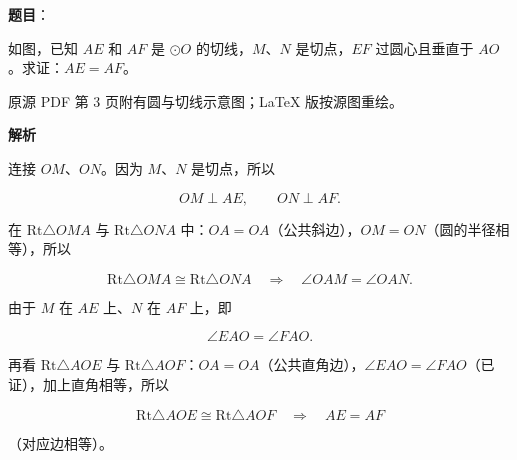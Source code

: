 \begin{answer}

\textbf{题目}：

如图，已知 $AE$ 和 $AF$ 是 $\odot O$ 的切线，$M\text{、}N$ 是切点，$EF$ 过圆心且垂直于 $AO$。求证：$AE=AF$。

\begin{gktip}
原源 PDF 第 3 页附有圆与切线示意图；LaTeX 版按源图重绘。
\end{gktip}
\nopagebreak[4]
\begin{center}\end{center}
\nopagebreak[4]
\textbf{解析}

连接 $OM\text{、}ON$。因为 $M\text{、}N$ 是切点，所以

\nopagebreak[4]
\[
OM\perp AE,
\qquad ON\perp AF.
\]

在 $\mathrm{Rt}\triangle OMA$ 与 $\mathrm{Rt}\triangle ONA$ 中：$OA=OA$（公共斜边），$OM=ON$（圆的半径相等），所以

\nopagebreak[4]
\[
\mathrm{Rt}\triangle OMA\cong\mathrm{Rt}\triangle ONA
\quad\Longrightarrow\quad
\angle OAM=\angle OAN.
\]

由于 $M$ 在 $AE$ 上、$N$ 在 $AF$ 上，即

\nopagebreak[4]
\[
\angle EAO=\angle FAO.
\]

再看 $\mathrm{Rt}\triangle AOE$ 与 $\mathrm{Rt}\triangle AOF$：$OA=OA$（公共直角边），$\angle EAO=\angle FAO$（已证），加上直角相等，所以

\nopagebreak[4]
\[
\mathrm{Rt}\triangle AOE\cong\mathrm{Rt}\triangle AOF
\quad\Longrightarrow\quad
AE=AF
\]

（对应边相等）。
\nopagebreak[4]
\begin{center}\end{center}
\nopagebreak[4]

\end{answer}
